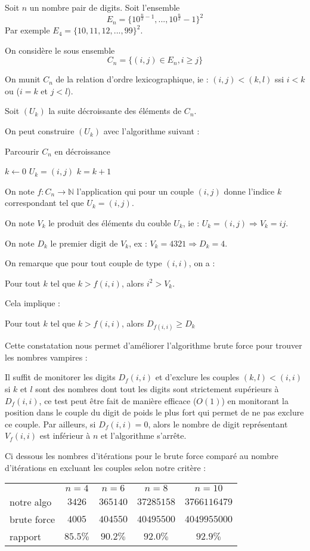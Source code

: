 \documentclass[10pt,a4paper,final]{article}
\begin{document}
Soit $n$ un nombre pair de digits.
Soit l'ensemble $$E_n=\{10^{\frac{n}{2}-1},...,10^{\frac{n}{2}}-1\}^2$$
Par exemple $E_4 = \{10,11,12,...,99\}^2$.

On considère le sous ensemble $$C_n = \{(i,j) \in E_n, i\geq j\}$$ 

On munit $C_n$ de la relation d'ordre lexicographique, ie :
$(i,j) < (k,l)$ ssi $i<k$ ou ($i=k$ et $j<l$).

Soit $(U_k)$ la suite décroissante des éléments de $C_n$.

On peut construire $(U_k)$ avec l'algorithme suivant : 
\begin{algorithm}
\caption{Parcourir $C_n$ en décroissance}
\begin{algorithmic} 
\STATE $k \leftarrow 0$
\STATE $U_k = (i,j)$
\STATE $k=k+1$
\ENDFOR
\ENDFOR
\end{algorithmic}
\end{algorithm}

On note $f : C_n \longrightarrow \mathbb{N}$ l'application qui pour un couple $(i,j)$ donne l'indice $k$ correspondant tel que $U_k = (i,j)$.

On note $V_k$ le produit des éléments du couble $U_k$, ie :
$U_k = (i,j) \Rightarrow V_k = ij$.

On note $D_k$ le premier digit de $V_k$, ex :
$V_k=4321 \Rightarrow D_k=4$.

On remarque que pour tout couple de type $(i,i)$, on a :

Pour tout $k$ tel que $k > f(i,i)$, alors $i^2>V_k$.

Cela implique :

Pour tout $k$ tel que $k > f(i,i)$, alors $D_{f(i,i)}\geq D_k$


Cette constatation nous permet d'améliorer l'algorithme brute force pour trouver les nombres vampires :

Il suffit de monitorer les digits $D_f(i,i)$ et d'exclure les couples $(k,l)<(i,i)$ si $k$ et $l$ sont des nombres dont tout les digits sont strictement supérieurs à $D_f(i,i)$, ce test peut être fait de manière efficace ($O(1)$) en monitorant la position dans le couple du digit de poids le plus fort qui permet de ne pas exclure ce couple.
Par ailleurs, si $D_f(i,i) = 0$, alors le nombre de digit représentant $V_f(i,i)$ est inférieur à $n$ et l'algorithme s'arrête.
\newline

Ci dessous les nombres d'itérations pour le brute force comparé au nombre d'itérations en excluant les couples selon notre critère :
\newline

\begin{tabular}{lcccc}

  \hline
    & $n = 4$ & $n=6$ & $n=8$ & $n=10$ \\
  notre algo & $3426$ & $365140$ & $37285158$ & $3766116479$ \\
  brute force & $4005$ & $404550$ & $40495500$ & $4049955000$ \\
  rapport & $85.5\%$ & $90.2\%$ & $92.0\%$ & $92.9\%$\\
  \hline
  \end{tabular}



  
\end{document}
